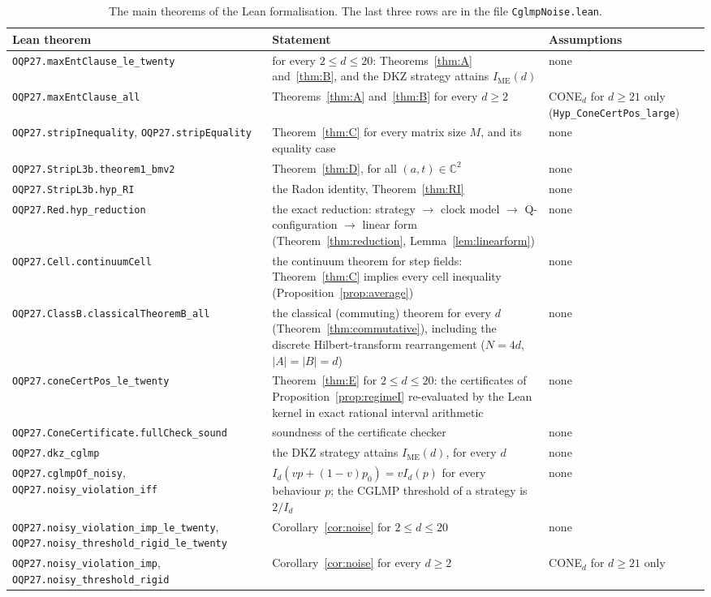 \documentclass[11pt]{amsart}
\theoremstyle{definition}
\theoremstyle{remark}
\numberwithin{equation}{section}
\newcommand{\C}{\mathbb{C}}
\newcommand{\IME}{I_{\mathrm{ME}}}
\begin{document}
\begin{table}[ht]
\small
\begin{tabular}{@{}>{\raggedright\arraybackslash}p{}>{\raggedright\arraybackslash}p{}>{\raggedright\arraybackslash}p{}@{}}
\toprule
Lean theorem & Statement & Assumptions\\
\midrule
\nolinkurl{OQP27.maxEntClause_le_twenty} & for every $2\le d\le20$: Theorems~\ref{thm:A} and~\ref{thm:B}, and the DKZ
strategy attains $\IME(d)$ & none\\
\nolinkurl{OQP27.maxEntClause_all} & Theorems~\ref{thm:A} and~\ref{thm:B} for every $d\ge2$ & CONE$_d$ for $d\ge21$ only
(\nolinkurl{Hyp_ConeCertPos_large})\\
\nolinkurl{OQP27.stripInequality}, \nolinkurl{OQP27.stripEquality} & Theorem~\ref{thm:C} for every matrix size $M$, and
its equality case & none\\
\nolinkurl{OQP27.StripL3b.theorem1_bmv2} & Theorem~\ref{thm:D}, for all $(a,t)\in\C^2$ & none\\
\nolinkurl{OQP27.StripL3b.hyp_RI} & the Radon identity, Theorem~\ref{thm:RI} & none\\
\nolinkurl{OQP27.Red.hyp_reduction} & the exact reduction: strategy $\to$ clock model $\to$ Q-configuration $\to$ linear
form (Theorem~\ref{thm:reduction}, Lemma~\ref{lem:linearform}) & none\\
\nolinkurl{OQP27.Cell.continuumCell} & the continuum theorem for step fields: Theorem~\ref{thm:C} implies every cell
inequality (Proposition~\ref{prop:average}) & none\\
\nolinkurl{OQP27.ClassB.classicalTheoremB_all} & the classical (commuting) theorem for every $d$
(Theorem~\ref{thm:commutative}), including the discrete Hilbert-transform rearrangement ($N=4d$, $|A|=|B|=d$) & none\\
\nolinkurl{OQP27.coneCertPos_le_twenty} & Theorem~\ref{thm:E} for $2\le d\le20$: the certificates of
Proposition~\ref{prop:regimeI} re-evaluated by the Lean kernel in exact rational interval arithmetic & none\\
\nolinkurl{OQP27.ConeCertificate.fullCheck_sound} & soundness of the certificate checker & none\\
\nolinkurl{OQP27.dkz_cglmp} & the DKZ strategy attains $\IME(d)$, for every $d$ & none\\
\nolinkurl{OQP27.cglmpOf_noisy}, \nolinkurl{OQP27.noisy_violation_iff} & $I_d(vp+(1-v)p_0)=vI_d(p)$ for every behaviour
$p$; the CGLMP threshold of a strategy is $2/I_d$ & none\\
\nolinkurl{OQP27.noisy_violation_imp_le_twenty}, \nolinkurl{OQP27.noisy_threshold_rigid_le_twenty} &
Corollary~\ref{cor:noise} for $2\le d\le20$ & none\\
\nolinkurl{OQP27.noisy_violation_imp}, \nolinkurl{OQP27.noisy_threshold_rigid} & Corollary~\ref{cor:noise} for every
$d\ge2$ & CONE$_d$ for $d\ge21$ only\\
\bottomrule
\end{tabular}
\caption{The main theorems of the Lean formalisation. The last three rows are in the file \texttt{CglmpNoise.lean}.}\label{tab:lean}
\end{table}
\end{document}
